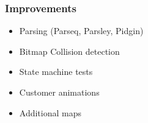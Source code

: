 \begin{frame}
    \frametitle{Improvements}
    \begin{itemize}
        \item Parsing (Parseq, Parsley, Pidgin)
        \item Bitmap Collision detection
        \item State machine tests
        \item Customer animations
        \item Additional maps
    \end{itemize}
\end{frame}
